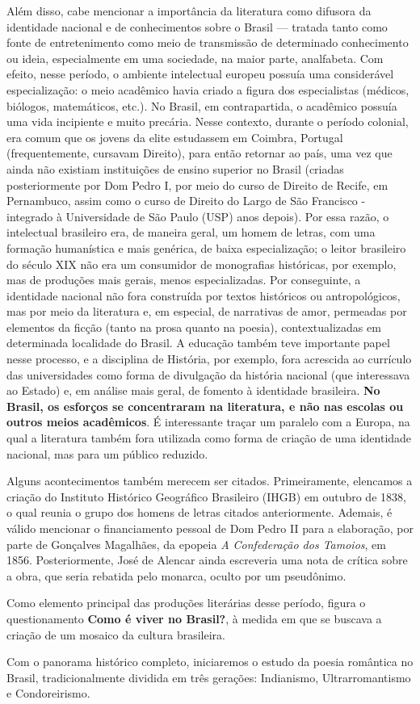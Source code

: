 \documentclass[12pt]{book}
\begin{document}
		\par Além disso, cabe mencionar a importância da literatura como difusora da identidade nacional e de conhecimentos sobre o Brasil — tratada tanto como fonte de entretenimento como meio de transmissão de determinado conhecimento ou ideia, especialmente em uma sociedade, na maior parte, analfabeta. Com efeito, nesse período, o ambiente intelectual europeu possuía uma considerável especialização: o meio acadêmico havia criado a figura dos especialistas (médicos, biólogos, matemáticos, etc.). No Brasil, em contrapartida, o acadêmico possuía uma vida incipiente e muito precária. Nesse contexto, durante o período colonial, era comum que os jovens da elite estudassem em Coimbra, Portugal (frequentemente, cursavam Direito), para então retornar ao país, uma vez que ainda não existiam instituições de ensino superior no Brasil (criadas posteriormente por Dom Pedro I, por meio do curso de Direito de Recife, em Pernambuco, assim como o curso de Direito do Largo de São Francisco - integrado à Universidade de São Paulo (USP) anos depois). Por essa razão, o intelectual brasileiro era, de maneira geral, um homem de letras, com uma formação humanística e mais genérica, de baixa especialização; o leitor brasileiro do século XIX não era um consumidor de monografias históricas, por exemplo, mas de produções mais gerais, menos especializadas. Por conseguinte, a identidade nacional não fora construída por textos históricos ou antropológicos, mas por meio da literatura e, em especial, de narrativas de amor, permeadas por elementos da ficção (tanto na prosa quanto na poesia), contextualizadas em determinada localidade do Brasil. A educação também teve importante papel nesse processo, e a disciplina de História, por exemplo, fora acrescida ao currículo das universidades como forma de divulgação da história nacional (que interessava ao Estado) e, em análise mais geral, de fomento à identidade brasileira. \textbf{No Brasil, os esforços se concentraram na literatura, e não nas escolas ou outros meios acadêmicos}. É interessante traçar um paralelo com a Europa, na qual a literatura também fora utilizada como forma de criação de uma identidade nacional, mas para um público reduzido.
		\par Alguns acontecimentos também merecem ser citados. Primeiramente, elencamos a criação do Instituto Histórico Geográfico Brasileiro (IHGB) em outubro de 1838, o qual reunia o grupo dos homens de letras citados anteriormente. Ademais, é válido mencionar o financiamento pessoal de Dom Pedro II para a elaboração, por parte de Gonçalves Magalhães, da epopeia \textit{A Confederação dos Tamoios}, em 1856. Posteriormente, José de Alencar ainda escreveria uma nota de crítica sobre a obra, que seria rebatida pelo monarca, oculto por um pseudônimo.
		\par Como elemento principal das produções literárias desse período, figura o questionamento \textbf{Como é viver no Brasil?}, à medida em que se buscava a criação de um mosaico da cultura brasileira.
		\par Com o panorama histórico completo, iniciaremos o estudo da poesia romântica no Brasil, tradicionalmente dividida em três gerações: Indianismo, Ultrarromantismo e Condoreirismo.
\end{document}
